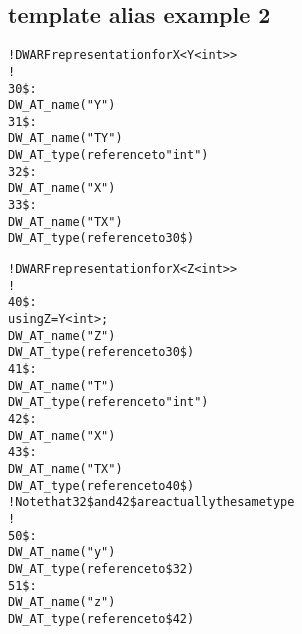 \subsection{template alias example 2}
\label{app:templatealiasexample2}
\begin{alltt}
! DWARF representation for X<Y<int>>
!
30\$: 
        DW\_AT\_name("Y")
31\$:   
            DW\_AT\_name("TY")
            DW\_AT\_type(reference to "int")
32\$: 
        DW\_AT\_name("X")
33\$:   
            DW\_AT\_name("TX")
            DW\_AT\_type(reference to 30\$)

! DWARF representation for X<Z<int>>
!
40\$: 
using Z = Y<int>;
        DW\_AT\_name("Z")
        DW\_AT\_type(reference to 30\$)
41\$:   
            DW\_AT\_name("T")
            DW\_AT\_type(reference to "int")
42\$: 
        DW\_AT\_name("X")
43\$:   
            DW\_AT\_name("TX")
            DW\_AT\_type(reference to 40\$)
! Note that 32\$ and 42\$ are actually the same type
!
50\$: 
        DW\_AT\_name("y")
        DW\_AT\_type(reference to \$32)
51\$: 
        DW\_AT\_name("z")
        DW\_AT\_type(reference to \$42)
\end{alltt}
